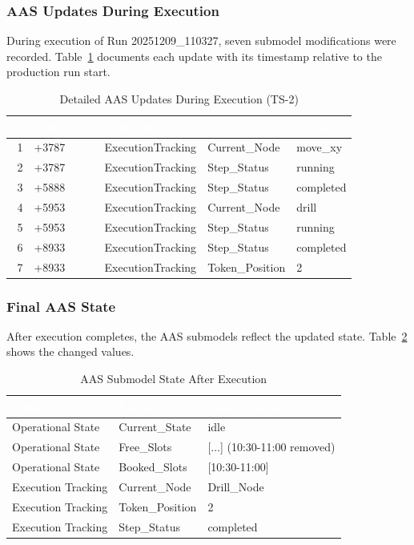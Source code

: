 \subsubsection{AAS Updates During Execution}

During execution of Run 20251209\_110327, seven submodel modifications were recorded. Table~\ref{tab:aas_updates_detailed} documents each update with its timestamp relative to the production run start.

\begin{table}[ht]
\centering
\caption{Detailed AAS Updates During Execution (TS-2)}
\label{tab:aas_updates_detailed}
\begin{tabular}{rllll}
\toprule
\rowcolor{headerblue}
\textcolor{white}{\#} & \textcolor{white}{Time (ms)} & \textcolor{white}{Submodel} & \textcolor{white}{Element} & \textcolor{white}{Value} \\
\midrule
1 & +3787 & ExecutionTracking & Current\_Node & move\_xy \\
2 & +3787 & ExecutionTracking & Step\_Status & running \\
\rowcolor{lightgray}
3 & +5888 & ExecutionTracking & Step\_Status & completed \\
4 & +5953 & ExecutionTracking & Current\_Node & drill \\
5 & +5953 & ExecutionTracking & Step\_Status & running \\
\rowcolor{lightgray}
6 & +8933 & ExecutionTracking & Step\_Status & completed \\
7 & +8933 & ExecutionTracking & Token\_Position & 2 \\
\bottomrule
\end{tabular}
\end{table}

\subsubsection{Final AAS State}

After execution completes, the \ac{AAS} submodels reflect the updated state. Table~\ref{tab:aas_after} shows the changed values.

\begin{table}[ht]
\centering
\caption{AAS Submodel State After Execution}
\label{tab:aas_after}
\begin{tabular}{lll}
\toprule
\rowcolor{headerblue}
\textcolor{white}{Submodel} & \textcolor{white}{Element} & \textcolor{white}{Value (Changed)} \\
\midrule
Operational State & Current\_State & idle \\
Operational State & Free\_Slots & [...] (10:30-11:00 removed) \\
Operational State & Booked\_Slots & [10:30-11:00] \\
\rowcolor{lightgray}
Execution Tracking & Current\_Node & Drill\_Node \\
Execution Tracking & Token\_Position & 2 \\
Execution Tracking & Step\_Status & completed \\
\bottomrule
\end{tabular}
\end{table}

